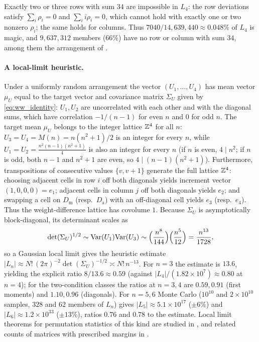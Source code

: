 Exactly two or three rows with sum $34$ are impossible in $L_4$: the row deviations satisfy $\sum_i\rho_i=0$ and $\sum_ii\rho_i=0$, which cannot hold with exactly one or two nonzero $\rho_i$; the same holds for columns.
Thus $7040/14{,}639{,}440\approx0.048\%$ of $L_4$ is magic, and $9{,}637{,}312$ members ($66\%$) have no row or column with sum $34$, among them the arrangement of .

\paragraph{A local-limit heuristic.}
Under a uniformly random arrangement the vector $(U_1,\dots,U_4)$ has mean vector $\mu_U$ equal to the target vector and covariance matrix $\Sigma_U$ given by \eqref{eq:ww_identity}: $U_1,U_2$ are uncorrelated with each other and with the diagonal sums, which have correlation $-1/(n-1)$ for even $n$ and $0$ for odd $n$.
The target mean $\mu_U$ belongs to the integer lattice $\mathbb{Z}^4$ for all $n$: $U_3=U_4=M(n)=n(n^2+1)/2$ is an integer for every $n$, while $U_1=U_2=\frac{n^2(n-1)(n^2+1)}{4}$ is also an integer for every $n$ (if $n$ is even, $4\mid n^2$; if $n$ is odd, both $n-1$ and $n^2+1$ are even, so $4\mid (n-1)(n^2+1)$).
Furthermore, transpositions of consecutive values $\{v, v+1\}$ generate the full lattice $\mathbb{Z}^4$: choosing adjacent cells in row $i$ off both diagonals yields increment vector $(1,0,0,0)=e_1$; adjacent cells in column $j$ off both diagonals yields $e_2$; and swapping a cell on $D_{\mathrm m}$ (resp.\ $D_{\mathrm a}$) with an off-diagonal cell yields $e_3$ (resp.\ $e_4$). Thus the weight-difference lattice has covolume $1$.
Because $\Sigma_U$ is asymptotically block-diagonal, its determinant scales as
\begin{equation}
\det(\Sigma_U)^{1/2}\sim\mathrm{Var}(U_1)\mathrm{Var}(U_3)\sim\Bigl(\frac{n^8}{144}\Bigr)\Bigl(\frac{n^5}{12}\Bigr)=\frac{n^{13}}{1728},
\label{eq:det_sigma_scaling}
\end{equation}
so a Gaussian local limit gives the heuristic estimate $|L_n|\approx N!\,(2\pi)^{-2}\det(\Sigma_U)^{-1/2}\asymp N!\,n^{-13}$.
For $n=3$ the estimate is $13.6$, yielding the explicit ratio $8/13.6\approx0.59$ (against $|L_4|/(1.82\times10^7)\approx0.80$ at $n=4$); for the two-condition classes the ratios at $n=3,4$ are $0.59,0.91$ (first moments) and $1.10,0.96$ (diagonals).
For $n=5,6$ Monte Carlo ($10^{10}$ and $2\times10^{10}$ samples, $328$ and $62$ members of $L_n$) gives $|L_5|\approx5.1\times10^{17}$ ($\pm6\%$) and $|L_6|\approx1.2\times10^{33}$ ($\pm13\%$), ratios $0.76$ and $0.78$ to the estimate.
Local limit theorems for permutation statistics of this kind are studied in \cite{kuperberg2017probabilistic,eberhard2019additive}, and related counts of matrices with prescribed margins in \cite{canfield2010asymptotic}.

